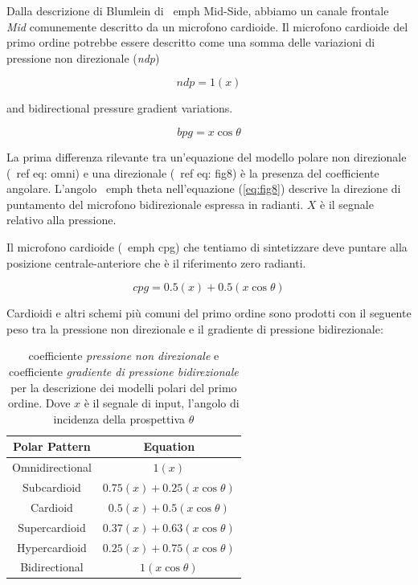 Dalla descrizione di Blumlein di \ emph {Mid-Side}, abbiamo un canale frontale
\emph{Mid} comunemente descritto da un microfono cardioide. Il microfono
cardioide del primo ordine potrebbe essere descritto come una somma delle
variazioni di pressione non direzionale (\emph{ndp})

\begin{equation}
ndp = 1(x)
\label{eq:omni}
\end{equation}

and bidirectional pressure gradient variations.

\begin{equation}
bpg = x\cos\theta
\label{eq:fig8}
\end{equation}

La prima differenza rilevante tra un'equazione del modello polare non
direzionale (\ ref {eq: omni}) e una direzionale (\ ref {eq: fig8}) è la
presenza del coefficiente angolare. L'angolo \ emph {theta} nell'equazione
(\ref{eq:fig8}) descrive la direzione di puntamento del microfono bidirezionale
espressa in radianti. $ X $ è il segnale relativo alla pressione.

Il microfono cardioide (\ emph {cpg}) che tentiamo di sintetizzare deve puntare
alla posizione centrale-anteriore che è il riferimento zero radianti.

\begin{equation}
cpg = 0.5(x) + 0.5(x\cos\theta)
\label{eq:cardioid}
\end{equation}

Cardioidi e altri schemi più comuni del primo ordine sono prodotti con il
seguente peso tra la pressione non direzionale e il gradiente di pressione
bidirezionale:

\begin{table}[h]
\begin{center}
\begin{tabular}{cc}
Polar Pattern & Equation \\
\hline
Omnidirectional & $ 1(x) $ \\
Subcardioid     & $ 0.75(x) + 0.25(x\cos\theta) $ \\
Cardioid        & $ 0.5(x) + 0.5(x\cos\theta) $ \\
Supercardioid   & $ 0.37(x) + 0.63(x\cos\theta) $ \\
Hypercardioid   & $ 0.25(x) + 0.75(x\cos\theta) $ \\
Bidirectional   & $ 1(x\cos\theta) $ \\
\end{tabular}
\end{center}
\caption{coefficiente \emph{pressione non direzionale} e coefficiente
\emph{gradiente di pressione bidirezionale} per la descrizione dei modelli
polari del primo ordine. Dove $ x $ è il segnale di input, l'angolo di incidenza
della prospettiva $\theta$}
\label{tab:example}
\end{table}

